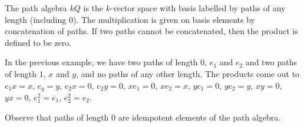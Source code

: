 The path algebra $kQ$ is the $k$-vector space with basis labelled by paths of any
length (including $0$). The multiplication is given on basis elements by
concatenation of paths. If two paths cannot be concatenated, then the
product is defined to be zero.

In the previous example, we have two paths of length $0$, $e_1$ and $e_2$ and
two paths of length $1$, $x$ and $y$, and no paths of any other length.
The products come out to $e_1x = x$, $e_y = y$, $e_2x = 0$, $e_2y = 0$,
$xe_1 = 0$, $xe_2 = x$, $ye_1 = 0$, $ye_2 = y$, $xy = 0$, $yx = 0$, $e_1^2 = e_1$,
$e_2^2 = e_2$.

Observe that paths of length $0$ are idempotent elements of the path algebra.
